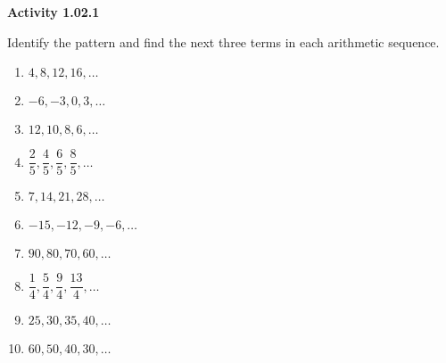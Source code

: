 \vspace{0.3ex}
\noindent\textbf{Activity 1.02.1}

\vspace{0.2ex}

Identify the pattern and find the next three terms in each arithmetic sequence.
\begin{multicols}{2}
\begin{enumerate}
    \item $4, 8, 12, 16, \dots$
    \item $-6, -3, 0, 3, \dots$
    \item $12, 10, 8, 6, \dots$
    \item $\dfrac{2}{5}, \dfrac{4}{5}, \dfrac{6}{5}, \dfrac{8}{5}, \dots$
    \item $7, 14, 21, 28, \dots$
    \item $-15, -12, -9, -6, \dots$
    \item $90, 80, 70, 60, \dots$
    \item $\dfrac{1}{4}, \dfrac{5}{4}, \dfrac{9}{4}, \dfrac{13}{4}, \dots$
    \item $25, 30, 35, 40, \dots$
    \item $60, 50, 40, 30, \dots$
\end{enumerate}
\end{multicols}
